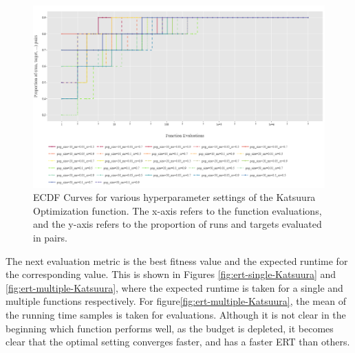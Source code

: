 \documentclass{article}
\begin{document}
\begin{figure}[h!]
    \centering
    \includegraphics[width=1\linewidth]{Graphs/Katsuura/Empirical_Cumulative_Distribution.png}
    \caption{ECDF Curves for various hyperparameter settings of the Katsuura Optimization function. The x-axis refers to the function evaluations, and the y-axis refers to the proportion of runs and targets evaluated in pairs. }
    \label{fig:emp_cumulative_distribution-Katsuura}
\end{figure}
The next evaluation metric is the best fitness value and the expected runtime for the corresponding value. This is shown in Figures \ref{fig:ert-single-Katsuura} and \ref{fig:ert-multiple-Katsuura}, where the expected runtime is taken for a single and multiple functions respectively. For  figure\ref{fig:ert-multiple-Katsuura}, the mean of the running time samples is taken for evaluations. Although it is not clear in the beginning which function performs well, as the budget is depleted, it becomes clear that the optimal setting converges faster, and has a faster ERT than others. 
\end{document}
